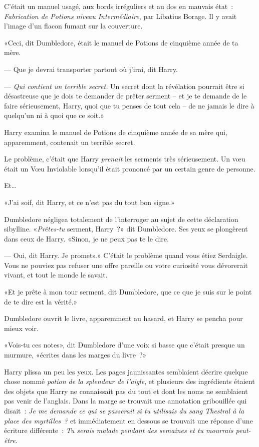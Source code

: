 C'était un manuel usagé, aux bords irréguliers et au dos en mauvais état~: \emph{Fabrication de Potions niveau Intermédiaire}, par Libatius Borage. Il y avait l'image d'un flacon fumant sur la couverture.

«Ceci, dit Dumbledore, était le manuel de Potions de cinquième année de ta mère.

--- Que je devrai transporter partout où j'irai, dit Harry.

--- \emph{Qui contient un terrible secret.} Un secret dont la révélation pourrait être si désastreuse que je dois te demander de prêter serment -- et je te demande de le faire sérieusement, Harry, quoi que tu penses de tout cela -- de ne jamais le dire à quelqu'un ni à quoi que ce soit.»

Harry examina le manuel de Potions de cinquième année de sa mère qui, apparemment, contenait un terrible secret.

Le problème, c'était que Harry \emph{prenait} les serments très sérieusement. Un vœu était un Vœu Inviolable lorsqu'il était prononcé par un certain genre de personne.

Et…

«J'ai soif, dit Harry, et ce n'est pas du tout bon signe.»

Dumbledore négligea totalement de l'interroger au sujet de cette déclaration sibylline. «\emph{Prêtes-tu} serment, Harry~?» dit Dumbledore. Ses yeux se plongèrent dans ceux de Harry. «Sinon, je ne peux pas te le dire.

--- Oui, dit Harry. Je promets.» C'était le problème quand vous étiez Serdaigle. Vous ne pouviez pas refuser une offre pareille ou votre curiosité vous dévorerait vivant, et tout le monde le savait.

«Et je prête à mon tour serment, dit Dumbledore, que ce que je suis sur le point de te dire est la vérité.»

Dumbledore ouvrit le livre, apparemment au hasard, et Harry se pencha pour mieux voir.

«Vois-tu ces notes», dit Dumbledore d'une voix si basse que c'était presque un murmure, «écrites dans les marges du livre~?»

Harry plissa un peu les yeux. Les pages jaunissantes semblaient décrire quelque chose nommé \emph{potion de la splendeur de l'aigle}, et plusieurs des ingrédients étaient des objets que Harry ne connaissait pas du tout et dont les noms ne semblaient pas venir de l'anglais. Dans la marge se trouvait une annotation gribouillée qui disait~: \emph{Je me demande ce qui se passerait si tu utilisais du sang Thestral à la place des myrtilles~?} et immédiatement en dessous se trouvait une réponse d'une écriture différente~: \emph{Tu serais malade pendant des semaines et tu mourrais peut-être}.

